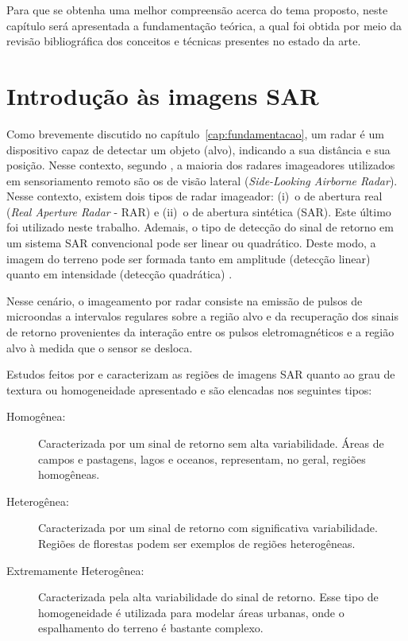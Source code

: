 
Para que se obtenha uma melhor compreensão acerca do tema proposto, neste  capítulo  será  apresentada  a  fundamentação teórica, a qual foi obtida por meio da revisão bibliográfica dos conceitos e técnicas presentes no estado da arte.

\section{Introdução às imagens SAR}

Como brevemente discutido no capítulo~\ref{cap:fundamentacao}, um radar é um dispositivo capaz de detectar um objeto (alvo), indicando a sua distância e sua posição. 
Nesse contexto, segundo \citet{dissert_torres}, a maioria dos radares imageadores utilizados em sensoriamento remoto são os de visão lateral (\textit{Side-Looking Airborne Radar}). 
Nesse contexto, existem dois tipos de radar imageador: 
(i)~o de abertura real (\textit{Real Aperture Radar} - RAR) e 
(ii)~o de abertura sintética (SAR). 
Este último foi utilizado neste trabalho. 
Ademais, o tipo de detecção do sinal de retorno em um sistema SAR convencional pode ser linear ou quadrático. 
Deste modo, a imagem do terreno pode ser formada tanto em amplitude (detecção linear) quanto em intensidade (detecção quadrática) \citep{dissert_lucca}. 

Nesse cenário, o imageamento por radar consiste na emissão de pulsos de microondas a intervalos regulares sobre a região alvo e da recuperação dos sinais de retorno provenientes da interação entre os pulsos eletromagnéticos e a região alvo à medida que o sensor se desloca.  

Estudos feitos por \citet{Clutter1997} e \citet{Gao2010StatisticalMO} caracterizam as regiões de imagens SAR quanto ao grau de textura ou homogeneidade apresentado e são elencadas nos seguintes tipos:
\begin{description}
    \item[Homogênea:] Caracterizada por um sinal de retorno sem alta variabilidade. Áreas de campos e pastagens, lagos e oceanos, representam, no geral, regiões homogêneas.
    \item[Heterogênea:] Caracterizada por um sinal de retorno com significativa variabilidade. Regiões de florestas podem ser exemplos de regiões heterogêneas.
    \item[Extremamente Heterogênea:] Caracterizada pela alta variabilidade do sinal de retorno. Esse tipo de homogeneidade é utilizada para modelar áreas urbanas, onde o espalhamento do terreno é bastante complexo.
\end{description}


